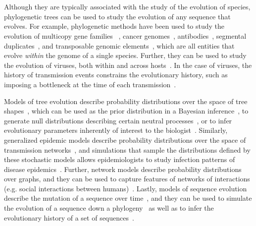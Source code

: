 \chapter*{\introtitle}
\clearpage

Although they are typically associated with the study of the evolution of species, phylogenetic trees can be used to study the evolution of any sequence that evolves. For example, phylogenetic methods have been used to study the evolution of multicopy gene families~ \cite{Page1997}, cancer genomes~\cite{El-Kebir2016,Nowell1976}, antibodies~\cite{Litman1993,Robinson2015,Safonova2015}, segmental duplicates~\cite{Bailey2006,Jiang2007}, and transposable genomic elements~\cite{Dewannieux2003,Moshiri2017}, which are all entities that evolve \textit{within} the genome of a single species. Further, they can be used to study the evolution of viruses, both within and across hosts~\cite{Frost2001,Lemey2006,Vrancken2014}. In the case of viruses, the history of transmission events constrains the evolutionary history, such as imposing a bottleneck at the time of each transmission~\cite{Carlson2014}.

Models of tree evolution describe probability distributions over the space of tree shapes~\cite{Yule1925,Aldous2001}, which can be used as the prior distribution in a Bayesian inference~\cite{Drummond2007,Mooers2012,Sayyari2016}, to generate null distributions describing certain neutral processes~\cite{Guyer1991,Kirkpatrick1993,Agapow2002}, or to infer evolutionary parameters inherently of interest to the biologist~\cite{Morlon2014}. Similarly, generalized epidemic models describe probability distributions over the space of transmission networks~\cite{Sahneh2013}, and simulations that sample the distributions defined by these stochastic models allows epidemiologists to study infection patterns of disease epidemics~\cite{Sahneh2017}. Further, network models describe probability distributions over graphs, and they can be used to capture features of networks of interactions (e.g. social interactions between humans)~\cite{Watts1998,Watts1999,Barabasi1999,Erdos1959}. Lastly, models of sequence evolution describe the mutation of a sequence over time~\cite{Jukes1969,Kimura1980,Felsenstein1981,Tamura1993,Tavare1986}, and they can be used to simulate the evolution of a sequence down a phylogeny~\cite{Rambaut1997} as well as to infer the evolutionary history of a set of sequences~\cite{Felsenstein2003}.

